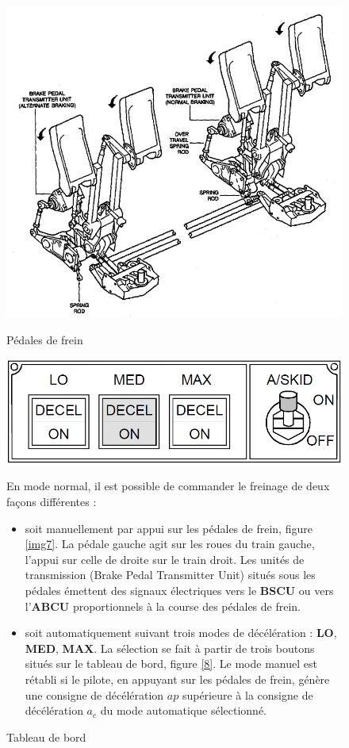 \begin{figure}[!h]
\begin{minipage}{0.38\linewidth}
 \begin{center}
 \includegraphics[width=0.7\linewidth]{img/Frein.png}
 \caption{Pédales de frein}
 \label{img7}
 \vspace{0.5cm}
  \includegraphics[width=0.5\linewidth]{img/Frein2.png}
 \caption{Tableau de bord}
 \label{img8}
  \end{center}
\end{minipage}\hfill
\begin{minipage}{0.6\linewidth}
En mode normal, il est possible de commander le freinage de deux façons différentes :
\begin{itemize}
 \item soit manuellement par appui sur les pédales de frein, figure \ref{img7}. La pédale gauche agit sur les roues du train gauche, l'appui sur celle de droite sur le train droit. Les unités de transmission (Brake Pedal Transmitter Unit) situés sous les pédales émettent des signaux électriques vers le \textbf{BSCU} ou vers l'\textbf{ABCU} proportionnels à la course des pédales de frein.
 \item soit automatiquement suivant trois modes de décélération : \textbf{LO}, \textbf{MED}, \textbf{MAX}. La sélection se fait à partir de trois boutons situés sur le tableau de bord, figure \ref{8}. Le mode manuel est rétabli si le pilote, en appuyant sur les pédales de frein, génère une consigne de décélération $ap$ supérieure à la consigne de décélération $a_c$ du mode automatique sélectionné.
\end{itemize} 
\end{minipage}
\end{figure}


